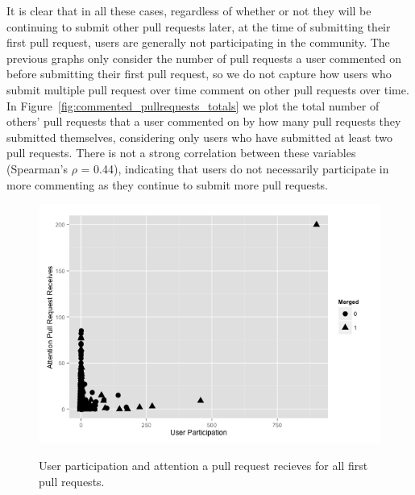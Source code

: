 \documentclass{iitthesis}
\begin{document}
It is clear that in all these cases, regardless of whether or not they will be
continuing to submit other pull requests later, at the time of submitting their
first pull request, users are generally not participating in the community. The
previous graphs only consider the number of pull requests a user commented on
before submitting their first pull request, so we do not capture how users who
submit multiple pull request over time comment on other pull requests over time.
In Figure~\ref{fig:commented_pullrequests_totals} we plot the total number of
others' pull requests that a user commented on by how many pull requests they
submitted themselves, considering only users who have submitted at least two
pull requests. There is not a strong correlation between these variables
(Spearman's $\rho$  = 0.44), indicating that users do not necessarily
participate in more commenting as they continue to submit more pull requests.

\begin{figure}[p] \centering \label{fig:aprr_up}
\includegraphics[scale=0.6]{figures/aprr_up_ggplot.png} \caption{User
participation and attention a pull request recieves for all first pull
requests.} \end{figure}
\end{document}
